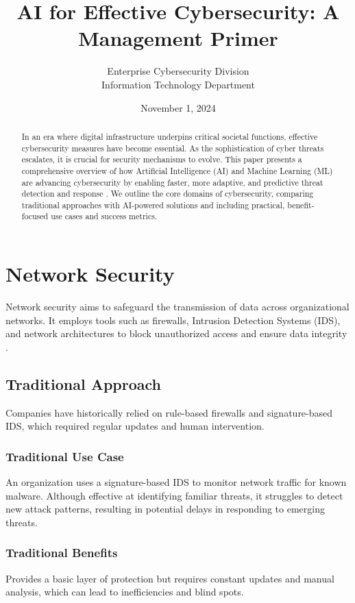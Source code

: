 \documentclass[10pt,a4paper]{article}
\title{AI for Effective Cybersecurity: A Management Primer}
\author{Enterprise Cybersecurity Division\\
Information Technology Department}
\date{November 1, 2024}
\begin{document}
\maketitle

\begin{abstract}
In an era where digital infrastructure underpins critical societal functions, effective cybersecurity measures have become essential. As the sophistication of cyber threats escalates, it is crucial for security mechanisms to evolve. This paper presents a comprehensive overview of how Artificial Intelligence (AI) and Machine Learning (ML) are advancing cybersecurity by enabling faster, more adaptive, and predictive threat detection and response \cite{sarker2024}. We outline the core domains of cybersecurity, comparing traditional approaches with AI-powered solutions and including practical, benefit-focused use cases and success metrics.
\end{abstract}

\section{Network Security}
Network security aims to safeguard the transmission of data across organizational networks. It employs tools such as firewalls, Intrusion Detection Systems (IDS), and network architectures to block unauthorized access and ensure data integrity \cite{sarker2024}.

\subsection{Traditional Approach}
Companies have historically relied on rule-based firewalls and signature-based IDS, which required regular updates and human intervention.

\subsubsection{Traditional Use Case}
An organization uses a signature-based IDS to monitor network traffic for known malware. Although effective at identifying familiar threats, it struggles to detect new attack patterns, resulting in potential delays in responding to emerging threats.

\subsubsection{Traditional Benefits}
Provides a basic layer of protection but requires constant updates and manual analysis, which can lead to inefficiencies and blind spots.
\end{document}
